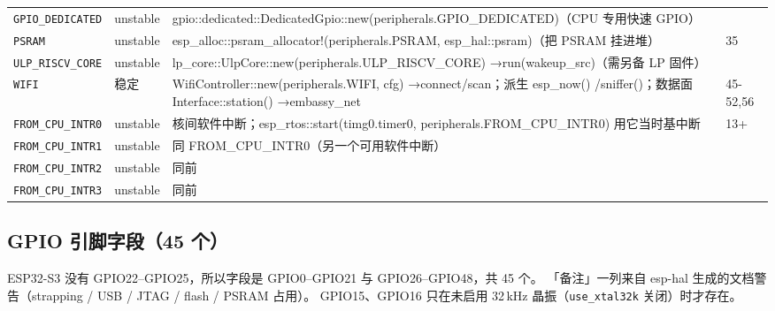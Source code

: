 \documentclass[UTF8,a4paper,11pt,fontset=fandol]{ctexart}
\newcommand{\fld}[1]{\texttt{#1}}
\begin{document}
\begin{center}
\begin{longtable}{@{}p{2.15cm}p{1.0cm}>{\raggedright\arraybackslash}p{9.4cm}p{1.65cm}@{}}
\fld{GPIO\_DEDICATED} & unstable & gpio::\allowbreak dedicated::\allowbreak DedicatedGpio::\allowbreak new(peripherals.GPIO\_DEDICATED)（CPU 专用快速 GPIO） &  \\
\fld{PSRAM} & unstable & esp\_alloc::\allowbreak psram\_allocator!(peripherals.PSRAM, esp\_hal::\allowbreak psram)（把 PSRAM 挂进堆） & 35 \\
\fld{ULP\_RISCV\_CORE} & unstable & lp\_core::\allowbreak UlpCore::\allowbreak new(peripherals.ULP\_RISCV\_CORE) →\allowbreak  run(wakeup\_src)（需另备 LP 固件） &  \\
\fld{WIFI} & 稳定 & WifiController::\allowbreak new(peripherals.WIFI, cfg) →\allowbreak  connect/\allowbreak scan；派生 esp\_now() /\allowbreak  sniffer()；数据面 Interface::\allowbreak station() →\allowbreak  embassy\_net & 45-52,56 \\
\fld{FROM\_CPU\_INTR0} & unstable & 核间软件中断；esp\_rtos::\allowbreak start(timg0.timer0, peripherals.FROM\_CPU\_INTR0) 用它当时基中断 & 13+ \\
\fld{FROM\_CPU\_INTR1} & unstable & 同 FROM\_CPU\_INTR0（另一个可用软件中断） &  \\
\fld{FROM\_CPU\_INTR2} & unstable & 同前 &  \\
\fld{FROM\_CPU\_INTR3} & unstable & 同前 &  \\
\end{longtable}
\end{center}

\newpage
\subsection{GPIO 引脚字段（45 个）}

ESP32-S3 没有 GPIO22--GPIO25，所以字段是 GPIO0--GPIO21 与 GPIO26--GPIO48，共 45 个。
「备注」一列来自 esp-hal 生成的文档警告（strapping / USB / JTAG / flash / PSRAM 占用）。
GPIO15、GPIO16 只在未启用 32\,kHz 晶振（\fld{use\_xtal32k} 关闭）时才存在。
\end{document}
